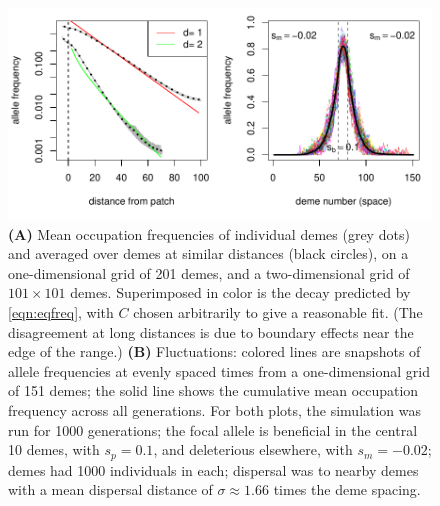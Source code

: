 \documentclass{article}
\begin{document}
\begin{figure}[ht!]
  \begin{center}
    \includegraphics{sim-occupation-freqs}
  \end{center}
  \caption{
  \textbf{(A)} 
  Mean occupation frequencies of individual demes (grey dots)
  and averaged over demes at similar distances (black circles), on
  a one-dimensional grid of 201 demes, and
  a two-dimensional grid of $101\times 101$ demes.
  Superimposed in color is the decay predicted by \eqref{eqn:eqfreq},
  with $C$ chosen arbitrarily to give a reasonable fit.
  (The disagreement at long distances is due to boundary effects near the edge of the range.)
  \textbf{(B)} 
  Fluctuations: colored lines are snapshots of allele frequencies at evenly spaced times
  from a one-dimensional grid of 151 demes;
  the solid line shows the cumulative mean occupation frequency across all generations.
  For both plots, the simulation was run for 1000 generations;
  the focal allele is beneficial in the central 10 demes, with $s_p=0.1$,
  and deleterious elsewhere, with $s_m=-0.02$; 
  demes had 1000 individuals in each;
  dispersal was to nearby demes with a mean dispersal distance of $\sigma \approx 1.66$  times the deme spacing.
   }   \label{fig:sim_occupation_freqs}
\end{figure}
\end{document}
